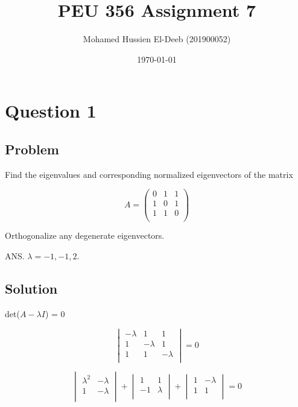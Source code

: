 \documentclass[12pt]{article}
\title{PEU 356 Assignment 7}
\author{Mohamed Hussien El-Deeb (201900052)}
\date{\today}
\begin{document}
\maketitle
\tableofcontents
\hypersetup{linkcolor=RoyalBlue4}

\newpage
\section{Question 1}

\subsection{Problem}

Find the eigenvalues and corresponding normalized eigenvectors of the matrix

\[
    A = \begin{pmatrix}
        0 & 1 & 1 \\
        1 & 0 & 1 \\
        1 & 1 & 0 \\
    \end{pmatrix}
\]

Orthogonalize any degenerate eigenvectors.

ANS. \(\lambda = -1, -1, 2. \)

\subsection{Solution}

det(\(A - \lambda I\)) = 0

\[
    \begin{vmatrix}
        -\lambda & 1        & 1        \\
        1        & -\lambda & 1        \\
        1        & 1        & -\lambda \\
    \end{vmatrix} = 0
\]

\[
    \begin{vmatrix}
        \lambda^2 & -\lambda \\
        1         & -\lambda \\
    \end{vmatrix} + \begin{vmatrix}
        1   & 1       \\
        - 1 & \lambda \\
    \end{vmatrix} + \begin{vmatrix}
        1 & -\lambda \\
        1 & 1        \\
    \end{vmatrix} = 0
\]
\end{document}
